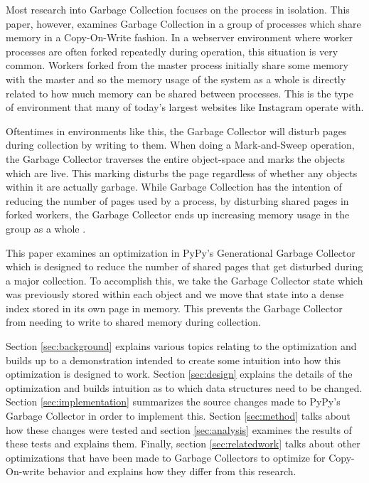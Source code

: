 \documentclass{article}
\begin{document}
\begin{sloppypar}
Most research into Garbage Collection focuses on the process in isolation.  This paper, however, examines Garbage Collection in a group of processes which share memory in a Copy-On-Write fashion.  In a webserver environment where worker processes are often forked repeatedly during operation, this situation is very common.  Workers forked from the master process initially share some memory with the master and so the memory usage of the system as a whole is directly related to how much memory can be shared between processes.  This is the type of environment that many of today's largest websites like Instagram operate with\cite{dismissing_garbage}.

Oftentimes in environments like this, the Garbage Collector will disturb pages during collection by writing to them.  When doing a Mark-and-Sweep operation, the Garbage Collector traverses the entire object-space and marks the objects which are live.  This marking disturbs the page regardless of whether any objects within it are actually garbage.  While Garbage Collection has the intention of reducing the number of pages used by a process, by disturbing shared pages in forked workers, the Garbage Collector ends up increasing memory usage in the group as a whole \cite{dismissing_garbage}.  

This paper examines an optimization in PyPy's Generational Garbage Collector\cite{pypy-doc} which is designed to reduce the number of shared pages that get disturbed during a major collection.  To accomplish this, we take the Garbage Collector state which was previously stored within each object and we move that state into a dense index stored in its own page in memory.  This prevents the Garbage Collector from needing to write to shared memory during collection.  

Section \ref{sec:background} explains various topics relating to the optimization and builds up to a demonstration intended to create some intuition into how this optimization is designed to work.  Section \ref{sec:design} explains the details of the optimization and builds intuition as to which data structures need to be changed.  Section \ref{sec:implementation} summarizes the source changes made to PyPy's Garbage Collector in order to implement this.  Section \ref{sec:method} talks about how these changes were tested and section \ref{sec:analysis} examines the results of these tests and explains them.  Finally, section \ref{sec:relatedwork} talks about other optimizations that have been made to Garbage Collectors to optimize for Copy-On-write behavior and explains how they differ from this research.  


\end{sloppypar}
\end{document}
